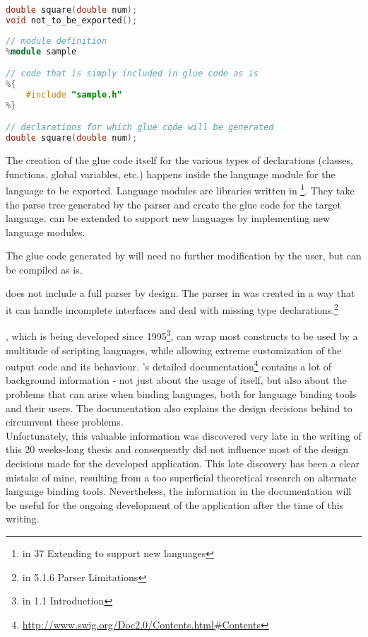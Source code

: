 \SingleSpacing
\begin{lstlisting}[language=C++, caption=Original header file: sample.h]
double square(double num);
void not_to_be_exported();
\end{lstlisting}
\OnehalfSpacing

\SingleSpacing
\begin{lstlisting}[language=C++, caption=According \myProperName{SWIG} interface file]
// module definition
%module sample

// code that is simply included in glue code as is
%{
    #include "sample.h"
%}

// declarations for which glue code will be generated
double square(double num);
\end{lstlisting}
\OnehalfSpacing

The creation of the glue code itself for the various types of declarations (classes, functions, global variables, etc.) happens inside the language module for the language to be exported. Language modules are libraries written in \footnote{\citep{SWIGHPDoc} in 37 Extending  to support new languages}. They take the parse tree generated by the  parser and create the glue code for the target language.  can be extended to support new languages by implementing new language modules.

The glue code generated by  will need no further modification by the user, but can be compiled as is.

 does not include a full  parser by design. The parser in  was created in a way that it can handle incomplete interfaces and deal with missing type declarations.\footnote{\citep{SWIGHPDoc} in 5.1.6 Parser Limitations}

, which is being developed since 1995\footnote{\citep{SWIGHPDoc} in 1.1 Introduction}, can wrap most  constructs to be used by a multitude of scripting languages, while allowing extreme customization of the output code and its behaviour. 's detailed documentation\footnote{\url{http://www.swig.org/Doc2.0/Contents.html\#Contents}} contains a lot of background information - not just about the usage of  itself, but also about the problems that can arise when binding languages, both for language binding tools and their users. The documentation also explains the design decisions behind  to circumvent these problems.
\\Unfortunately, this valuable information was discovered very late in the writing of this 20 weeks-long thesis and consequently did not influence most of the design decisions made for the developed application. This late discovery has been a clear mistake of mine, resulting from a too superficial theoretical research on alternate language binding tools. Nevertheless, the information in the documentation will be useful for the ongoing development of the application after the time of this writing.

